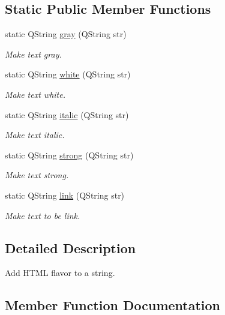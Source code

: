 \subsection*{Static Public Member Functions}
\begin{DoxyCompactItemize}
\item 
static Q\+String \hyperlink{classHtml_a4e22ddd91517477b1746f61b337f7d26}{gray} (Q\+String str)
\begin{DoxyCompactList}\small\item\em Make text gray. \end{DoxyCompactList}\item 
static Q\+String \hyperlink{classHtml_aa1ff559b97635462aef31a98f7277a53}{white} (Q\+String str)
\begin{DoxyCompactList}\small\item\em Make text white. \end{DoxyCompactList}\item 
static Q\+String \hyperlink{classHtml_a0c5391338202adb52475498e38143bb1}{italic} (Q\+String str)
\begin{DoxyCompactList}\small\item\em Make text italic. \end{DoxyCompactList}\item 
static Q\+String \hyperlink{classHtml_adf0b7c3aa257d977810e6f3a60e98e6a}{strong} (Q\+String str)
\begin{DoxyCompactList}\small\item\em Make text strong. \end{DoxyCompactList}\item 
static Q\+String \hyperlink{classHtml_a1a01e004b980594e5223db319b4677c6}{link} (Q\+String str)
\begin{DoxyCompactList}\small\item\em Make text to be link. \end{DoxyCompactList}\end{DoxyCompactItemize}


\subsection{Detailed Description}
Add H\+T\+ML flavor to a string. 

\subsection{Member Function Documentation}
